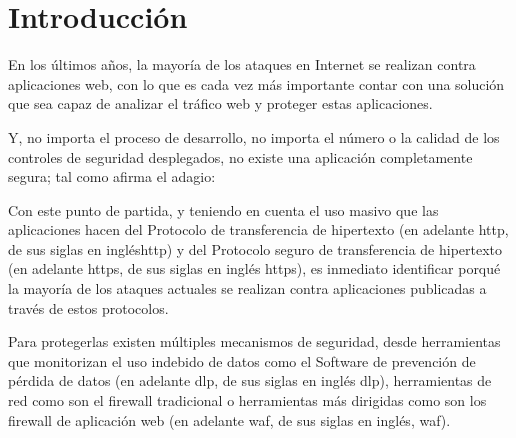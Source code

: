 \chapter{Introducción}
\par En los últimos años, la mayoría de los ataques en Internet se realizan contra aplicaciones web, con lo que es cada vez más importante contar con una
solución que sea capaz de analizar el tráfico web y proteger estas aplicaciones.
\par Y, no importa el proceso de desarrollo, no importa el número o la calidad de los controles de seguridad desplegados, no existe una aplicación completamente
segura; tal como afirma el adagio:


\par Con este punto de partida, y teniendo en cuenta el uso masivo que las aplicaciones hacen del Protocolo de transferencia de hipertexto (en adelante
\acrshort{http}, de sus siglas en inglés\acrlong{http}) y del Protocolo seguro de transferencia de hipertexto (en adelante \acrshort{https}, de sus siglas en
inglés \acrlong{https}), es inmediato identificar porqué la mayoría de los ataques actuales se realizan contra aplicaciones publicadas a través de estos
protocolos.

\par Para protegerlas existen múltiples mecanismos de seguridad, desde herramientas que monitorizan el uso indebido de datos como el Software de prevención de
pérdida de datos (en adelante \acrshort{dlp}, de sus siglas en inglés \acrlong{dlp}), herramientas de red como son el firewall tradicional o herramientas más
dirigidas como son los firewall de aplicación web (en adelante \acrshort{waf}, de sus siglas en inglés, \acrlong{waf}).

